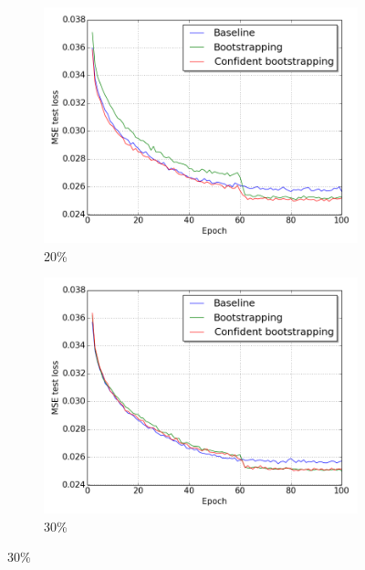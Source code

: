 \begin{figure}[H]
\begin{subfigure}{0.31\textwidth}
\end{subfigure}
\hspace*{\fill} %
\begin{subfigure}{0.31\textwidth}
\includegraphics[width=\textwidth]{figs/E2/lc_2.png}
\caption{20\% } \label{fig:app_E2_2_lc}
\vspace{0.1cm} %
\end{subfigure}
\begin{subfigure}{0.31\textwidth}
\includegraphics[width=\textwidth]{figs/E2/lc_3.png}
\caption{ 30\%} \label{fig:app_E2_3_lc}
\vspace{0.1cm} %

\end{subfigure}
\end{figure}
